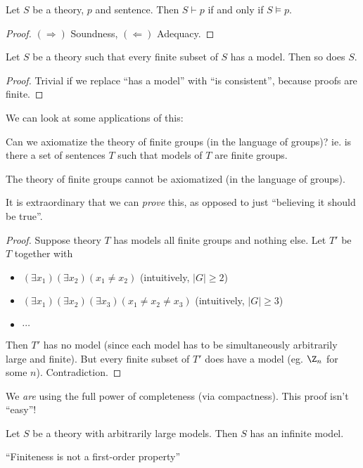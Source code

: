 \documentclass[a4paper]{article}
\begin{document}
\begin{thm}
  Let $S$ be a theory, $p$ and sentence. Then $S\vdash p$ if and only if $S \models p$.
\end{thm}

\begin{proof}
  $(\Rightarrow)$ Soundness, $(\Leftarrow)$ Adequacy.
\end{proof}

\begin{cor}
  Let $S$ be a theory such that every finite subset of $S$ has a model. Then so does $S$.
\end{cor}

\begin{proof}
  Trivial if we replace ``has a model'' with ``is consistent'', because proofs are finite.
\end{proof}

We can look at some applications of this:

Can we axiomatize the theory of finite groups (in the language of groups)? ie. is there a set of sentences $T$ such that models of $T$ are finite groups.

\begin{cor}
  The theory of finite groups cannot be axiomatized (in the language of groups).
\end{cor}
It is extraordinary that we can \emph{prove} this, as opposed to just ``believing it should be true''.

\begin{proof}
  Suppose theory $T$ has models all finite groups and nothing else.  Let $T'$ be $T$ together with
  \begin{itemize}
    \item $(\exists x_1)(\exists x_2)(x_1 \not = x_2)$ (intuitively, $|G| \geq 2$)
    \item $(\exists x_1)(\exists x_2)(\exists x_3)(x_1 \not= x_2 \not= x_3)$ (intuitively, $|G| \geq 3$)
    \item $\cdots$
  \end{itemize}
  Then $T'$ has no model (since each model has to be simultaneously arbitrarily large and finite). But every finite subset of  $T'$ does have a model (eg. $\Z_n$ for some $n$). Contradiction.
\end{proof}
\note We \emph{are} using the full power of completeness (via compactness). This proof isn't ``easy''!

\begin{cor}
  Let $S$ be a theory with arbitrarily large models. Then $S$ has an infinite model.

  ``Finiteness is not a first-order property''
\end{cor}
\end{document}
